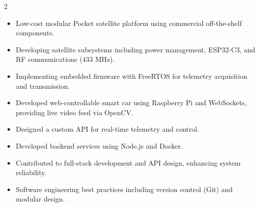 \documentclass[10pt,a4paper,ragged2e,withhyper]{altacv}
\begin{document}
\begin{paracol}{2}
            \begin{itemize}
            \item Low-cost modular Pocket satellite platform using commercial off-the-shelf components.
            \item Developing satellite subsystems including power management, ESP32-C3, and RF communications (433 MHz).
            \item Implementing embedded firmware with FreeRTOS for telemetry acquisition and transmission.
            \end{itemize}
            
            \begin{itemize}
                \item Developed web-controllable smart car using Raspberry Pi and WebSockets, providing live video feed via OpenCV.
                \item Designed a custom API for real-time telemetry and control.
            \end{itemize}
            
        
            \begin{itemize}
                \item Developed backend services using Node.js and Docker.
                \item Contributed to full-stack development and API design, enhancing system reliability.
                \item Software engineering best practices including version control (Git) and modular design.
            \end{itemize}
            \divider
            

\end{paracol}
\end{document}
